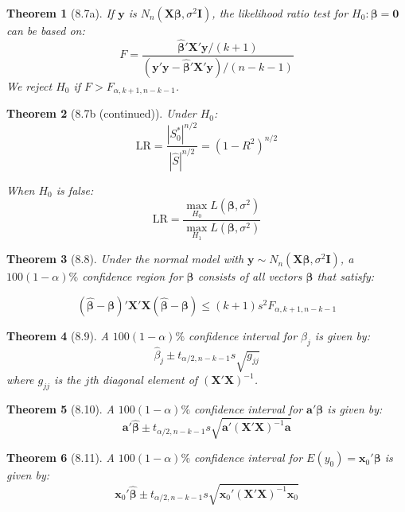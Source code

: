\documentclass{article}
\newtheorem{theorem}{Theorem}[section]
\begin{document}
\begin{theorem}[8.7a]
If $\mathbf{y}$ is $N_n(\mathbf{X}\boldsymbol{\beta}, \sigma^2\mathbf{I})$, the likelihood ratio test for $H_0:\boldsymbol{\beta} = \mathbf{0}$ can be based on:
\[F = \frac{\hat{\boldsymbol{\beta}}'\mathbf{X}'\mathbf{y}/(k+1)}{(\mathbf{y}'\mathbf{y} - \hat{\boldsymbol{\beta}}'\mathbf{X}'\mathbf{y})/(n-k-1)}\]
We reject $H_0$ if $F > F_{\alpha,k+1,n-k-1}$.
\end{theorem}

\begin{theorem}[8.7b (continued)]
Under $H_0$:
\[\text{LR} = \frac{|S^*_0|^{n/2}}{|\hat{S}|^{n/2}} = (1-R^2)^{n/2}\]

When $H_0$ is false:
\[\text{LR} = \frac{\max_{H_0} L(\boldsymbol{\beta},\sigma^2)}{\max_{H_1} L(\boldsymbol{\beta},\sigma^2)}\]
\end{theorem}

\begin{theorem}[8.8]
Under the normal model with $\mathbf{y} \sim N_n(\mathbf{X}\boldsymbol{\beta}, \sigma^2\mathbf{I})$, a $100(1-\alpha)\%$ confidence region for $\boldsymbol{\beta}$ consists of all vectors $\boldsymbol{\beta}$ that satisfy:

\[(\hat{\boldsymbol{\beta}} - \boldsymbol{\beta})'\mathbf{X}'\mathbf{X}(\hat{\boldsymbol{\beta}} - \boldsymbol{\beta}) \leq (k+1)s^2F_{\alpha,k+1,n-k-1}\]
\end{theorem}

\begin{theorem}[8.9]
A $100(1-\alpha)\%$ confidence interval for $\beta_j$ is given by:
\[\hat{\beta}_j \pm t_{\alpha/2,n-k-1}s\sqrt{g_{jj}}\]
where $g_{jj}$ is the $j$th diagonal element of $(\mathbf{X}'\mathbf{X})^{-1}$.
\end{theorem}

\begin{theorem}[8.10] 
A $100(1-\alpha)\%$ confidence interval for $\mathbf{a}'\boldsymbol{\beta}$ is given by:
\[\mathbf{a}'\hat{\boldsymbol{\beta}} \pm t_{\alpha/2,n-k-1}s\sqrt{\mathbf{a}'(\mathbf{X}'\mathbf{X})^{-1}\mathbf{a}}\]
\end{theorem}

\begin{theorem}[8.11]
A $100(1-\alpha)\%$ confidence interval for $E(y_0)=\mathbf{x}_0'\boldsymbol{\beta}$ is given by:
\[\mathbf{x}_0'\hat{\boldsymbol{\beta}} \pm t_{\alpha/2,n-k-1}s\sqrt{\mathbf{x}_0'(\mathbf{X}'\mathbf{X})^{-1}\mathbf{x}_0}\]
\end{theorem}
\end{document}

